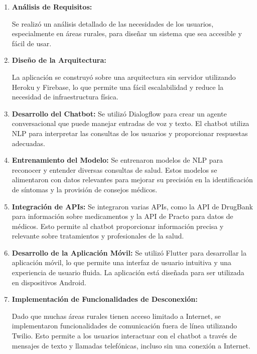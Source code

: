 		\begin{enumerate}
		
		\item \textbf{Análisis de Requisitos:}
		
			\subitem Se realizó un análisis detallado de las necesidades de los usuarios, especialmente en áreas rurales, para diseñar un sistema que sea accesible y fácil de usar.
		
		\item \textbf{Diseño de la Arquitectura:}
		
			\subitem La aplicación se construyó sobre una arquitectura sin servidor utilizando Heroku y Firebase, lo que permite una fácil escalabilidad y reduce la necesidad de infraestructura física.
		
		\item \textbf{Desarrollo del Chatbot:}
			\subitem Se utilizó Dialogflow para crear un agente conversacional que puede manejar entradas de voz y texto. El chatbot utiliza NLP para interpretar las consultas de los usuarios y proporcionar respuestas adecuadas.
	
		\item \textbf{Entrenamiento del Modelo:}
			\subitem Se entrenaron modelos de NLP para reconocer y entender diversas consultas de salud. Estos modelos se alimentaron con datos relevantes para mejorar su precisión en la identificación de síntomas y la provisión de consejos médicos.
			
		\item \textbf{Integración de APIs:}
			\subitem Se integraron varias APIs, como la API de DrugBank para información sobre medicamentos y la API de Practo para datos de médicos. Esto permite al chatbot proporcionar información precisa y relevante sobre tratamientos y profesionales de la salud.
	
		\item \textbf{Desarrollo de la Aplicación Móvil:}
			\subitem Se utilizó Flutter para desarrollar la aplicación móvil, lo que permite una interfaz de usuario intuitiva y una experiencia de usuario fluida. La aplicación está diseñada para ser utilizada en dispositivos Android.
		
		\item \textbf{Implementación de Funcionalidades de Desconexión:}
	
			\subitem Dado que muchas áreas rurales tienen acceso limitado a Internet, se implementaron funcionalidades de comunicación fuera de línea utilizando Twilio. Esto permite a los usuarios interactuar con el chatbot a través de mensajes de texto y llamadas telefónicas, incluso sin una conexión a Internet.
		

\end{enumerate}
